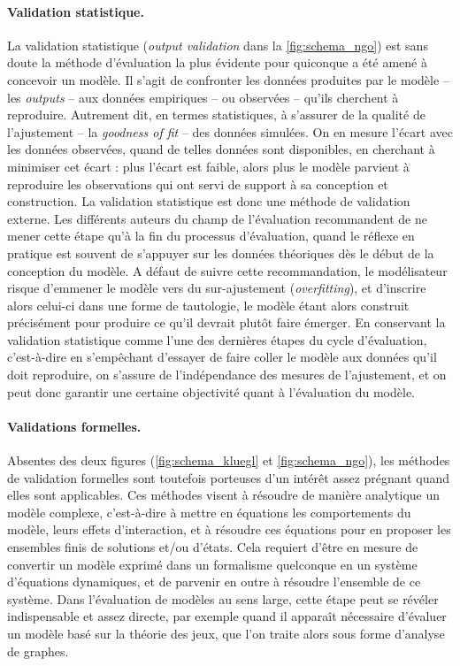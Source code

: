 \paragraph{Validation statistique.}
La validation statistique (\og \textit{output validation}\fg{} dans la \cref{fig:schema_ngo}) est sans doute la méthode d'évaluation la plus évidente pour quiconque a été amené à concevoir un modèle. Il s'agit de confronter les données produites par le modèle -- les \textit{outputs} --
aux données empiriques -- ou observées -- qu'ils cherchent à reproduire.
Autrement dit, en termes statistiques, à s'assurer de la qualité de l'ajustement -- la \textit{goodness of fit} -- des données simulées.
On en mesure l'écart avec les données observées, quand de telles données sont disponibles, en cherchant à minimiser cet écart :
	plus l'écart est faible, alors plus le modèle parvient à reproduire les observations qui ont servi de support à sa conception et construction.
La validation statistique est donc une méthode de validation externe.
Les différents auteurs du champ de l'évaluation recommandent de ne mener cette étape qu'à la fin du processus d'évaluation, quand le réflexe en pratique est souvent de s'appuyer sur les données théoriques dès le début de la conception du modèle.
A défaut de suivre cette recommandation, le modélisateur risque d'emmener le modèle vers du \og sur-ajustement \fg{} (\textit{overfitting}), et d'inscrire alors celui-ci dans une forme de tautologie, le modèle étant alors construit précisément pour produire ce qu'il devrait plutôt faire émerger.
En conservant la validation statistique comme l'une des dernières étapes du cycle d'évaluation, c'est-à-dire en s'empêchant d'essayer de faire coller le modèle aux données qu'il doit reproduire, on s'assure de l'indépendance des mesures de l'ajustement, et on peut donc garantir une certaine objectivité quant à l'évaluation du modèle.

\paragraph{Validations formelles.}
Absentes des deux figures (\ref{fig:schema_kluegl} et \ref{fig:schema_ngo}), les méthodes de validation formelles sont toutefois porteuses d'un intérêt assez prégnant quand elles sont applicables.
Ces méthodes visent à résoudre de manière analytique un modèle complexe, c'est-à-dire à mettre en équations les comportements du modèle, leurs effets d'interaction, et à résoudre ces équations pour en proposer les ensembles finis de solutions et/ou d'états.
Cela requiert d'être en mesure de convertir un modèle exprimé dans un formalisme quelconque en un système d'équations dynamiques, et de parvenir en outre à résoudre l'ensemble de ce système.
Dans l'évaluation de modèles au sens large, cette étape peut se révéler indispensable et assez directe, par exemple quand il apparaît nécessaire d'évaluer un modèle basé sur la théorie des jeux, que l'on traite alors sous forme d'analyse de graphes.

